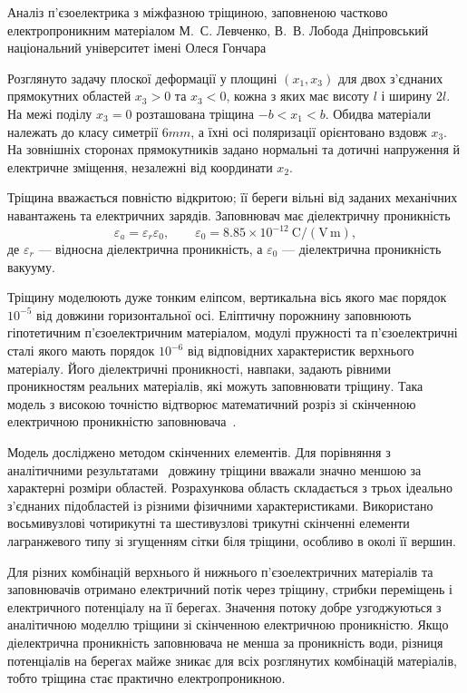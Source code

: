 \ReportHeading
  {Аналіз п’єзоелектрика з міжфазною тріщиною, заповненою частково електропроникним матеріалом}
  {М.~С. Левченко, В.~В. Лобода}
  {Дніпровський національний університет імені Олеся Гончара}
  {}

Розглянуто задачу плоскої деформації у площині $(x_1,x_3)$ для двох з’єднаних прямокутних областей $x_3>0$ та $x_3<0$, кожна з яких має висоту $l$ і ширину $2l$. На межі поділу $x_3=0$ розташована тріщина $-b<x_1<b$. Обидва матеріали належать до класу симетрії $6mm$, а їхні осі поляризації орієнтовано вздовж $x_3$. На зовнішніх сторонах прямокутників задано нормальні та дотичні напруження й електричне зміщення, незалежні від координати $x_2$.

Тріщина вважається повністю відкритою; її береги вільні від заданих механічних навантажень та електричних зарядів. Заповнювач має діелектричну проникність
\[
  \varepsilon_a=\varepsilon_r\varepsilon_0,
  \qquad
  \varepsilon_0=8.85\times10^{-12}\ \mathrm{C/(V\,m)},
\]
де $\varepsilon_r$ --- відносна діелектрична проникність, а $\varepsilon_0$ --- діелектрична проникність вакууму.

Тріщину моделюють дуже тонким еліпсом, вертикальна вісь якого має порядок $10^{-5}$ від довжини горизонтальної осі. Еліптичну порожнину заповнюють гіпотетичним п’єзоелектричним матеріалом, модулі пружності та п’єзоелектричні сталі якого мають порядок $10^{-6}$ від відповідних характеристик верхнього матеріалу. Його діелектричні проникності, навпаки, задають рівними проникностям реальних матеріалів, які можуть заповнювати тріщину. Така модель з високою точністю відтворює математичний розріз зі скінченною електричною проникністю заповнювача~\cite{piezo:Hao1994}.

Модель досліджено методом скінченних елементів. Для порівняння з аналітичними результатами~\cite{piezo:Govorukha2006} довжину тріщини вважали значно меншою за характерні розміри областей. Розрахункова область складається з трьох ідеально з’єднаних підобластей із різними фізичними характеристиками. Використано восьмивузлові чотирикутні та шестивузлові трикутні скінченні елементи лагранжевого типу зі згущенням сітки біля тріщини, особливо в околі її вершин.

Для різних комбінацій верхнього й нижнього п’єзоелектричних матеріалів та заповнювачів отримано електричний потік через тріщину, стрибки переміщень і електричного потенціалу на її берегах. Значення потоку добре узгоджуються з аналітичною моделлю тріщини зі скінченною електричною проникністю. Якщо діелектрична проникність заповнювача не менша за проникність води, різниця потенціалів на берегах майже зникає для всіх розглянутих комбінацій матеріалів, тобто тріщина стає практично електропроникною.

